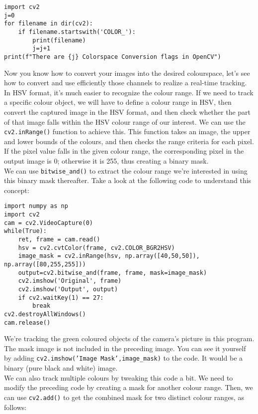 \documentclass{labo}
\begin{document}
\begin{verbatim}
import cv2
j=0
for filename in dir(cv2):
	if filename.startswith('COLOR_'):
		print(filename)
		j=j+1
print(f"There are {j} Colorspace Conversion flags in OpenCV")
\end{verbatim}

Now you know how to convert your images into the desired colourspace, let’s see how to
convert and use efficiently those channels to realize a real-time tracking.\\

In HSV format, it's much easier to recognize the colour range. If we need to track a specific
colour object, we will have to define a colour range in HSV, then convert the captured image in the HSV
format, and then check whether the part of that image falls within the HSV colour range of our
interest. We can use the \texttt{cv2.inRange()} function to achieve this. This function takes an image, the upper and lower bounds of the colours, and then checks the range criteria for each pixel. If the pixel
value falls in the given colour range, the corresponding pixel in the output image is 0; otherwise it is
255, thus creating a binary mask.\\

We can use \texttt{bitwise\_and()} to extract the colour range we're interested in using this binary mask thereafter. Take a look at the following code to understand this concept:

\begin{verbatim}
import numpy as np
import cv2
cam = cv2.VideoCapture(0)
while(True):
	ret, frame = cam.read()
	hsv = cv2.cvtColor(frame, cv2.COLOR_BGR2HSV)
	image_mask = cv2.inRange(hsv, np.array([40,50,50]), np.array([80,255,255]))
	output=cv2.bitwise_and(frame, frame, mask=image_mask)
	cv2.imshow('Original', frame)
	cv2.imshow('Output', output)
	if cv2.waitKey(1) == 27:
		break
cv2.destroyAllWindows()
cam.release()
\end{verbatim}

We're tracking the {\color{green}green} coloured objects of the camera’s picture in this program.\\

The mask image is not included in the preceding image. You can see it yourself by adding
\texttt{cv2.imshow('Image Mask',image\_mask)} to the code. It would be a binary (pure black and white) image.\\

We can also track multiple colours by tweaking this code a bit. We need to modify the
preceding code by creating a mask for another colour range. Then, we can use \texttt{cv2.add()} to get the combined mask for two distinct colour ranges, as follows:
\end{document}

